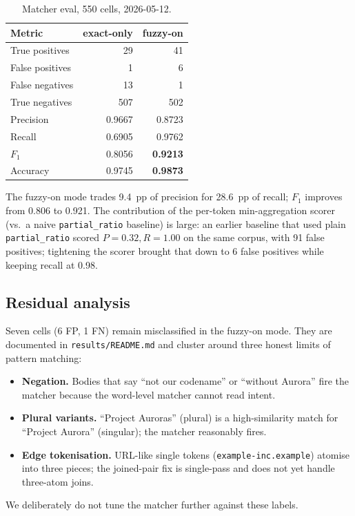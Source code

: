 \documentclass[conference]{IEEEtran}
\begin{document}
\begin{table}[htbp]
\caption{Matcher eval, 550 cells, 2026-05-12.}
\label{tab:eval}
\centering
\renewcommand{\arraystretch}{1.1}
\begin{tabular}{lrr}
\toprule
\textbf{Metric} & \textbf{exact-only} & \textbf{fuzzy-on} \\
\midrule
True positives    &  29    & 41        \\
False positives   &   1    &  6        \\
False negatives   &  13    &  1        \\
True negatives    & 507    & 502       \\
Precision         & 0.9667 & 0.8723    \\
Recall            & 0.6905 & 0.9762    \\
$F_{1}$           & 0.8056 & \textbf{0.9213} \\
Accuracy          & 0.9745 & \textbf{0.9873} \\
\bottomrule
\end{tabular}
\end{table}

The fuzzy-on mode trades 9.4~pp of precision for 28.6~pp of recall;
$F_{1}$ improves from 0.806 to 0.921. The contribution of the
per-token min-aggregation scorer (vs.\ a naive
\texttt{partial\_ratio} baseline) is large: an earlier baseline
that used plain \texttt{partial\_ratio} scored $P{=}0.32, R{=}1.00$
on the same corpus, with 91 false positives; tightening the scorer
brought that down to 6 false positives while keeping recall at
0.98.

\subsection{Residual analysis}
Seven cells (6 FP, 1 FN) remain misclassified in the fuzzy-on
mode. They are documented in \texttt{results/README.md} and
cluster around three honest limits of pattern matching:
\begin{itemize}
  \item \textbf{Negation.} Bodies that say ``not our codename'' or
        ``without Aurora'' fire the matcher because the
        word-level matcher cannot read intent.
  \item \textbf{Plural variants.} ``Project Auroras'' (plural) is
        a high-similarity match for ``Project Aurora'' (singular);
        the matcher reasonably fires.
  \item \textbf{Edge tokenisation.} URL-like single tokens
        (\texttt{example-inc.example}) atomise into three pieces;
        the joined-pair fix is single-pass and does not yet
        handle three-atom joins.
\end{itemize}
We deliberately do not tune the matcher further against these
labels.
\end{document}
